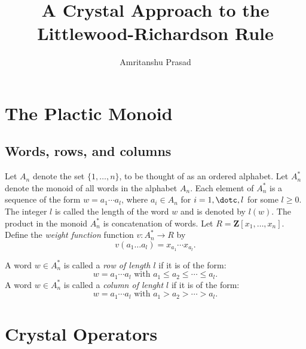 \documentclass[12pt]{amsart}
\title{A Crystal Approach to the Littlewood-Richardson Rule}
\author{Amritanshu Prasad}
\theoremstyle{definition}
\theoremstyle{example}
\newcommand{\ZZ}{\mathbf Z}
\begin{document}
\section{The Plactic Monoid}
\subsection{Words, rows, and columns}
Let $A_n$ denote the set $\{1,\dotsc,n\}$, to be thought of as an ordered alphabet.
Let $A_n^*$ denote the monoid of all words in the alphabet $A_n$.
Each element of $A_n^*$ is a sequence of the form $w=a_1\dotsb a_l$, where $a_i\in A_n$ for $i=1,\dotc,l$ for some $l\geq 0$.
The integer $l$ is called the length of the word $w$ and is denoted by $l(w)$.
The product in the monoid $A_n^*$ is concatenation of words.
Let $R=\ZZ[x_1,\dotsc,x_n]$.
Define the \emph{weight function} function $v:A_n^*\to R$ by
\begin{displaymath}
  v(a_1\dotsc a_l) = x_{a_1}\dotsb x_{a_l}.
\end{displaymath}

A word $w\in A_n^*$ is called a \emph{row of length $l$} if it is of the form:
\begin{displaymath}
  w = a_1\dotsb a_l \text{ with } a_1\leq a_2\leq \dotsb \leq a_l.
\end{displaymath}
A word $w\in A_n^*$ is called a \emph{column of lenght $l$} if it is of the form:
\begin{displaymath}
  w = a_1\dotsb a_l \text{ with } a_1> a_2> \dotsb > a_l.
\end{displaymath}

\section{Crystal Operators}
\end{document}
